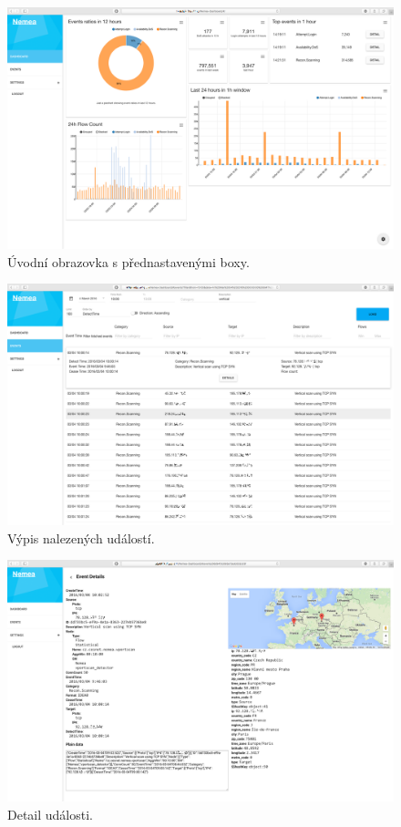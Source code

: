\begin{figure}[ht]
    \centering
    \includegraphics[width=1\textwidth]{fig/screen_before_1.png}
    \caption{Úvodní obrazovka s přednastavenými boxy.} \label{screen:before:1}
\end{figure}

\begin{figure}[ht]
    \centering
    \includegraphics[width=1\textwidth]{fig/screen_before_2.png}
    \caption{Výpis nalezených událostí.} \label{screen:before:2}
\end{figure}

\begin{figure}[ht]
    \centering
    \includegraphics[width=1\textwidth]{fig/screen_before_3.png}
    \caption{Detail události.} \label{screen:before:3}
\end{figure}



